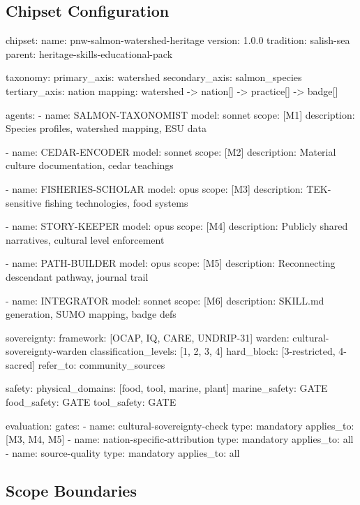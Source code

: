 \documentclass[11pt,letterpaper]{article}
\begin{document}
\subsection{Chipset Configuration}

\begin{asciibox}
chipset:
  name: pnw-salmon-watershed-heritage
  version: 1.0.0
  tradition: salish-sea
  parent: heritage-skills-educational-pack

  taxonomy:
    primary_axis: watershed
    secondary_axis: salmon_species
    tertiary_axis: nation
    mapping: watershed -> nation[] -> practice[] -> badge[]

  agents:
    - name: SALMON-TAXONOMIST
      model: sonnet
      scope: [M1]
      description: Species profiles, watershed mapping, ESU data

    - name: CEDAR-ENCODER
      model: sonnet
      scope: [M2]
      description: Material culture documentation, cedar teachings

    - name: FISHERIES-SCHOLAR
      model: opus
      scope: [M3]
      description: TEK-sensitive fishing technologies, food systems

    - name: STORY-KEEPER
      model: opus
      scope: [M4]
      description: Publicly shared narratives, cultural level enforcement

    - name: PATH-BUILDER
      model: opus
      scope: [M5]
      description: Reconnecting descendant pathway, journal trail

    - name: INTEGRATOR
      model: sonnet
      scope: [M6]
      description: SKILL.md generation, SUMO mapping, badge defs

  sovereignty:
    framework: [OCAP, IQ, CARE, UNDRIP-31]
    warden: cultural-sovereignty-warden
    classification_levels: [1, 2, 3, 4]
    hard_block: [3-restricted, 4-sacred]
    refer_to: community_sources

  safety:
    physical_domains: [food, tool, marine, plant]
    marine_safety: GATE
    food_safety: GATE
    tool_safety: GATE

  evaluation:
    gates:
      - name: cultural-sovereignty-check
        type: mandatory
        applies_to: [M3, M4, M5]
      - name: nation-specific-attribution
        type: mandatory
        applies_to: all
      - name: source-quality
        type: mandatory
        applies_to: all
\end{asciibox}

\subsection{Scope Boundaries}
\end{document}
